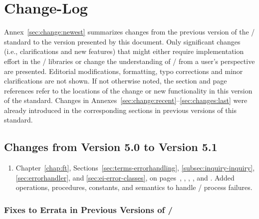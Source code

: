 \chapter{Change-Log}
\label{sec:change}
\label{chap:change}

Annex~\ref{sec:change:newest} summarizes changes from the previous
version of the
\MPI/ standard to the version presented by this document.
Only significant changes (i.e., clarifications and new features) 
that might either require implementation effort in the 
\MPI/ libraries or change the understanding of \MPI/ from a 
user's perspective are presented.
Editorial modifications, formatting, typo corrections and
minor clarifications are not shown. 
If not otherwise noted, the section and page references refer to the
locations of the change or new functionality in this
version of the standard. 
Changes in Annexes~\ref{sec:change:recent}--\ref{sec:changes:last}
were already introduced in the corresponding sections
in previous versions of this standard. 

\section{Changes from Version 5.0 to Version 5.1}
\label{subsec:50to51}
\label{sec:change:newest}

\begin{enumerate}
\item
    Chapter~\ref{chap:ft}, Sections~\ref{sec:terms-errorhandling}, \ref{subsec:inquiry-inquiry}, \ref{sec:errorhandler}, and \ref{sec:ei-error-classes},
    on pages~\pageref{chap:ft}, \pageref{sec:terms-errorhandling}, \pageref{subsec:inquiry-inquiry}, \pageref{sec:errorhandler}, and \pageref{sec:ei-error-classes}.
    \newline
    Added operations, procedures, constants, and semantics to handle \MPI/ process failures.
\end{enumerate}

\subsection{Fixes to Errata in Previous Versions of \texorpdfstring{\MPI/}{MPI}}
\label{sec:changes-50-51-errata}

